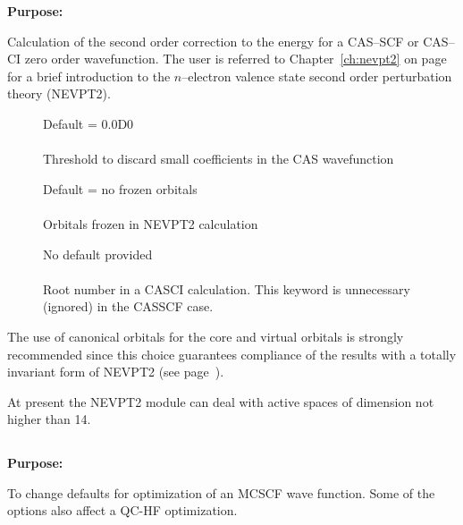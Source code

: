 {\bf Purpose:}

Calculation of the second order correction to the energy for a
CAS--SCF or CAS--CI zero order wavefunction.
The user is referred to Chapter~\ref{ch:nevpt2} on
page~\pageref{ch:nevpt2}  for a brief
introduction to the $n$--electron valence state second order
perturbation theory (NEVPT2).

\begin{description}
\item[]
 Default = 0.0D0\\
   \\
  Threshold to discard small coefficients in the CAS wavefunction


\item[]
  Default = no frozen orbitals\\
   \\
  Orbitals frozen in NEVPT2 calculation

\item[]
 No default provided\\
 \\
Root number in a CASCI calculation. This keyword is unnecessary
(ignored) in the CASSCF case.
\end{description}





The use of canonical orbitals for the core and virtual orbitals is
strongly recommended since this choice guarantees compliance of the
results with a totally invariant form of NEVPT2 (see page~\pageref{ch:nevpt2}).

At present the NEVPT2 module can deal with active spaces of dimension
not higher than 14.

\pagebreak[3]
\subsection{\label{ref-optinp}}

{\bf Purpose:}

To change defaults for optimization of an MCSCF wave function.
Some of the options also affect a QC-HF optimization.

